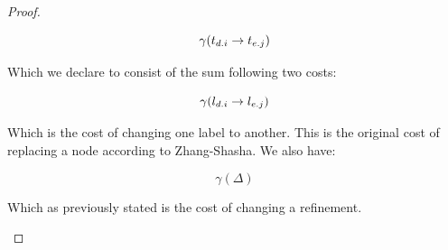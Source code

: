 \begin{lemma}
\begin{proof}
\begin{enumerate}
                  $$\gamma({t_{{d}.{i}}} \rightarrow {t_{{e}.{j}}})$$

                  Which we declare to consist of the sum following two costs:

                  $$\gamma({l_{{d}.{i}}} \rightarrow {l_{{e}.{j}}})$$

                  Which is the cost of changing one label to another. This is the original cost of replacing a node according to Zhang-Shasha. We also have:

                  $$\gamma(\Delta)$$

                  Which as previously stated is the cost of changing a refinement.



        \end{enumerate}

    \end{proof}

\end{lemma}




